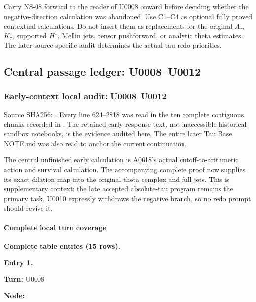 Carry NS-08 forward to the reader of U0008 onward before deciding
whether the negative-direction calculation was abandoned. Use C1--C4 as
optional fully proved contextual calculations. Do not insert them as
replacements for the original \(A_\tau\), \(K_\tau\), supported \(H^1\),
Mellin jets, tensor pushforward, or analytic theta estimates. The later
source-specific audit determines the actual tau redo priorities.

\subsection{Central passage ledger:
U0008--U0012}\label{central-passage-ledger-u0008u0012}

\subsubsection{Early-context local audit:
U0008--U0012}\label{early-context-local-audit-u0008u0012}

Source SHA256:
\protect{}.
Every line 624--2818 was read in the ten complete contiguous chunks
recorded in \protect{}. The retained early response
text, not inaccessible historical sandbox notebooks, is the evidence
audited here. The entire later Tau Base NOTE.md was also read to anchor
the current continuation.

The central unfinished early calculation is A0618's actual
cutoff-to-arithmetic action and survival calculation. The accompanying
complete proof now supplies its exact dilation map into the original
theta complex and full jets. This is supplementary context: the late
accepted absolute-tau program remains the primary task. U0010 expressly
withdraws the negative branch, so no redo prompt should revive it.

\paragraph{Complete local turn
coverage}\label{complete-local-turn-coverage}

\textbf{Complete table entries (15 rows).}


\textbf{Entry 1.}

\textbf{Turn:} U0008

\textbf{Node:} \protect{}

